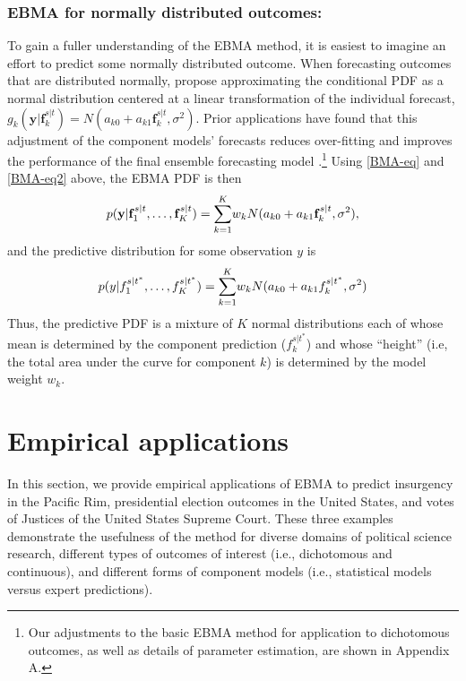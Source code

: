 \documentclass[12pt,fullpage,endnotes]{article}
\newcommand{\note}[1]{\footnote{ #1 \vspace{4 mm}}}
\begin{document}
\subsubsection{EBMA for normally distributed outcomes:}
To gain a fuller understanding of the EBMA method, it is easiest to
imagine an effort to predict some normally distributed outcome.  When
forecasting outcomes that are distributed normally,
\citet{Raftery:2005} propose approximating the conditional PDF as a
normal distribution centered at a linear transformation of the
individual forecast, $g_k(\mathbf{y}|\mathbf{f}_k^{s|t}) = N(a_{k0} +
a_{k1}\mathbf{f}_k^{s|t}, \sigma^2)$.  Prior applications have found
that this adjustment of the component models' forecasts reduces
over-fitting and improves the performance of the final ensemble
forecasting model \citep{Raftery:2005}.\note{Our adjustments to the
  basic EBMA method for application to dichotomous outcomes, as well
  as details of parameter estimation, are shown in Appendix A.}  Using
\eqref{BMA-eq} and \eqref{BMA-eq2} above, the EBMA PDF is then
\begin{equation} \small
p(\mathbf{y}|\mathbf{f}_1^{s|t}, \ldots, \mathbf{f}_K^{s|t}) = \overset{K}{\underset{k=1}{\sum}} w_k N(a_{k0} +
a_{k1}\mathbf{f}_k^{s|t}, \sigma^2),
\end{equation}
\noindent and the predictive distribution for some observation $y$ is 
\begin{equation} \small
p(y|f_1^{s|t^\ast}, \ldots, f_K^{s|t^\ast}) = \overset{K}{\underset{k=1}{\sum}} w_k N(a_{k0} +
a_{k1}f_k^{s|t^\ast}, \sigma^2)
 \end{equation}
 \noindent Thus, the predictive PDF is a mixture of $K$ normal
 distributions each of whose mean is determined by the component
 prediction ($f_k^{s|t^\ast}$) and whose ``height'' (i.e, the total
 area under the curve for component $k$) is determined by the model
 weight $w_k$.




\section{Empirical applications}

In this section, we provide empirical applications of EBMA to predict
insurgency in the Pacific Rim, presidential election outcomes in the
United States, and votes of Justices of the United States Supreme
Court.  These three examples demonstrate the usefulness of the method
for diverse domains of political science research, different types of
outcomes of interest (i.e., dichotomous and continuous), and different
forms of component models (i.e., statistical models versus expert
predictions).
\end{document}
